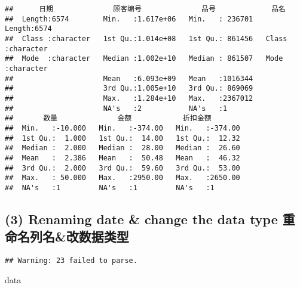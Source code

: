 \documentclass[
]{article}
\newenvironment{Shaded}{\begin{snugshade}}{\end{snugshade}}
\newcommand{\FunctionTok}[1]{\textcolor[rgb]{0.00,0.00,0.00}{#1}}
\newcommand{\NormalTok}[1]{#1}
\newcommand{\OtherTok}[1]{\textcolor[rgb]{0.56,0.35,0.01}{#1}}
\newcommand{\SpecialCharTok}[1]{\textcolor[rgb]{0.00,0.00,0.00}{#1}}
\newcommand{\StringTok}[1]{\textcolor[rgb]{0.31,0.60,0.02}{#1}}
\begin{document}
\begin{verbatim}
##      日期              顾客编号              品号             品名          
##  Length:6574        Min.   :1.617e+06   Min.   : 236701   Length:6574       
##  Class :character   1st Qu.:1.014e+08   1st Qu.: 861456   Class :character  
##  Mode  :character   Median :1.002e+10   Median : 861507   Mode  :character  
##                     Mean   :6.093e+09   Mean   :1016344                     
##                     3rd Qu.:1.005e+10   3rd Qu.: 869069                     
##                     Max.   :1.284e+10   Max.   :2367012                     
##                     NA's   :2           NA's   :1                           
##       数量              金额            折扣金额      
##  Min.   :-10.000   Min.   :-374.00   Min.   :-374.00  
##  1st Qu.:  1.000   1st Qu.:  14.00   1st Qu.:  12.32  
##  Median :  2.000   Median :  28.00   Median :  26.60  
##  Mean   :  2.386   Mean   :  50.48   Mean   :  46.32  
##  3rd Qu.:  2.000   3rd Qu.:  59.60   3rd Qu.:  53.00  
##  Max.   : 50.000   Max.   :2950.00   Max.   :2650.00  
##  NA's   :1         NA's   :1         NA's   :1
\end{verbatim}

\hypertarget{renaming-date-change-the-data-type-ux91cdux547dux540dux5217ux540dux6539ux6570ux636eux7c7bux578b}{%
\subsection{(3) Renaming date \& change the data type
重命名列名\&改数据类型}\label{renaming-date-change-the-data-type-ux91cdux547dux540dux5217ux540dux6539ux6570ux636eux7c7bux578b}}

\begin{Shaded}
\end{Shaded}

\begin{verbatim}
## Warning: 23 failed to parse.
\end{verbatim}

\begin{Shaded}
\begin{Highlighting}[]
\NormalTok{data}
\end{Highlighting}
\end{Shaded}
\end{document}
